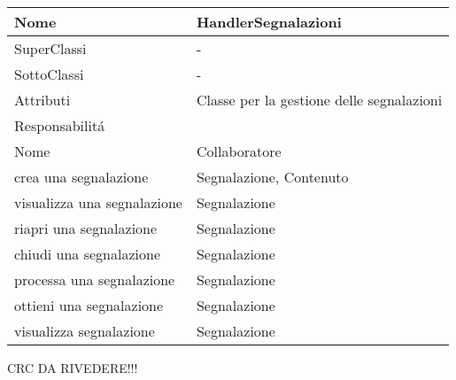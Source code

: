 \begin{center}
    \begin{tabular}{ |p{3cm}|p{3cm}|p{3cm}|p{3cm}| }
        \hline
        Nome & \multicolumn{3}{|p{9cm}|}{HandlerSegnalazioni} \\\hline
        SuperClassi & \multicolumn{3}{|p{9cm}|}{-} \\\hline
        SottoClassi & \multicolumn{3}{|p{9cm}|}{-} \\\hline
        Attributi & \multicolumn{3}{|p{9cm}|}{Classe per la gestione delle segnalazioni} \\\hline
        \multicolumn{4}{|p{12cm}|}{Responsabilit\'a} \\\hline
        \multicolumn{2}{|p{6cm}|}{Nome} & \multicolumn{2}{|p{6cm}|}{Collaboratore} \\\hline
        \multicolumn{2}{|p{6cm}|}{crea una segnalazione} & \multicolumn{2}{|p{6cm}|}{Segnalazione, Contenuto} \\\hline
        \multicolumn{2}{|p{6cm}|}{visualizza una segnalazione} & \multicolumn{2}{|p{6cm}|}{Segnalazione} \\\hline
        \multicolumn{2}{|p{6cm}|}{riapri una segnalazione} & \multicolumn{2}{|p{6cm}|}{Segnalazione} \\\hline
        \multicolumn{2}{|p{6cm}|}{chiudi una segnalazione} & \multicolumn{2}{|p{6cm}|}{Segnalazione} \\\hline
        \multicolumn{2}{|p{6cm}|}{processa una segnalazione} & \multicolumn{2}{|p{6cm}|}{Segnalazione} \\\hline
        \multicolumn{2}{|p{6cm}|}{ottieni una segnalazione} & \multicolumn{2}{|p{6cm}|}{Segnalazione} \\\hline
        \multicolumn{2}{|p{6cm}|}{visualizza segnalazione} & \multicolumn{2}{|p{6cm}|}{Segnalazione} \\\hline
    \end{tabular}
\end{center}

\newpage
CRC DA RIVEDERE!!!

